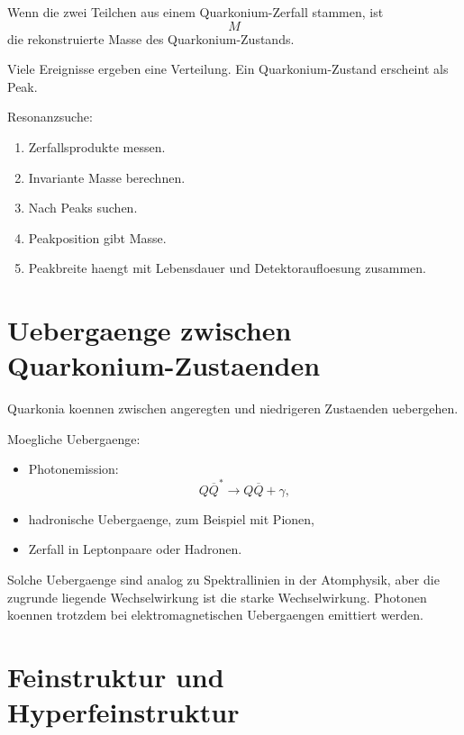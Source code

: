 \begin{conceptbox}
Wenn die zwei Teilchen aus einem Quarkonium-Zerfall stammen, ist
\[
    M
\]
die rekonstruierte Masse des Quarkonium-Zustands.

Viele Ereignisse ergeben eine Verteilung.
Ein Quarkonium-Zustand erscheint als Peak.
\end{conceptbox}

\begin{examtipbox}
Resonanzsuche:
\begin{enumerate}
    \item Zerfallsprodukte messen.
    \item Invariante Masse berechnen.
    \item Nach Peaks suchen.
    \item Peakposition gibt Masse.
    \item Peakbreite haengt mit Lebensdauer und Detektoraufloesung zusammen.
\end{enumerate}
\end{examtipbox}

\section{Uebergaenge zwischen Quarkonium-Zustaenden}

Quarkonia koennen zwischen angeregten und niedrigeren Zustaenden uebergehen.

\begin{conceptbox}
Moegliche Uebergaenge:
\begin{itemize}
    \item Photonemission:
    \[
        Q\overline{Q}^{*}
        \rightarrow
        Q\overline{Q}
        +
        \gamma,
    \]
    \item hadronische Uebergaenge, zum Beispiel mit Pionen,
    \item Zerfall in Leptonpaare oder Hadronen.
\end{itemize}
\end{conceptbox}

\begin{notebox}
Solche Uebergaenge sind analog zu Spektrallinien in der Atomphysik, aber die
zugrunde liegende Wechselwirkung ist die starke Wechselwirkung.
Photonen koennen trotzdem bei elektromagnetischen Uebergaengen emittiert werden.
\end{notebox}

\section{Feinstruktur und Hyperfeinstruktur}

